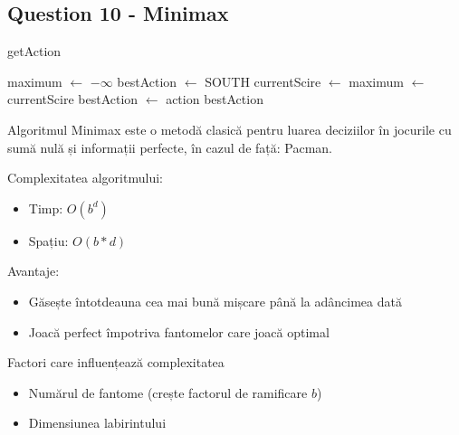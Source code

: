 \subsection{Question 10 - Minimax}

\begin{algorithm}
\caption{getAction}
\begin{algorithmic}[1]
    \State maximum $\gets$ $-\infty$
    \State bestAction $\gets$ SOUTH
        \State currentScire $\gets$ 
            \State maximum $\gets$ currentScire
            \State bestAction $\gets$ action
        \EndIf
    \EndFor
    \State \Return bestAction
\EndFunction
\end{algorithmic}
\end{algorithm}

\par Algoritmul Minimax este o metodă clasică pentru luarea deciziilor în jocurile cu sumă nulă și informații perfecte, în cazul de față: Pacman.

\par Complexitatea algoritmului:

\begin{itemize}
    \item Timp: $O(b^d)$
    \item Spațiu: $O(b*d)$
\end{itemize}

\par Avantaje:
\begin {itemize}
	\item Găsește întotdeauna cea mai bună mișcare până la adâncimea dată
	\item Joacă perfect împotriva fantomelor care joacă optimal
\end {itemize}
\par Factori care influențează complexitatea
\begin{itemize}
	\item Numărul de fantome (crește factorul de ramificare $b$)
	\item Dimensiunea labirintului
\end{itemize}

